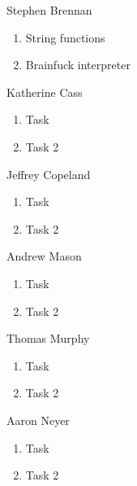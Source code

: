 \documentclass[journal,10pt]{IEEEtran}
\begin{document}
\begin{LaTeXitemize} \itemsep0pt \parskip0pt
  \item Stephen Brennan
  \begin{enumerate}
    \item String functions
    \item Brainfuck interpreter
  \end{enumerate}
  
  \item Katherine Cass
  \begin{enumerate}
    \item Task
    \item Task 2
  \end{enumerate}
  
  \item Jeffrey Copeland
  \begin{enumerate}
    \item Task
    \item Task 2
  \end{enumerate}

  \item Andrew Mason
  \begin{enumerate}
    \item Task
    \item Task 2
  \end{enumerate}

  \item Thomas Murphy
  \begin{enumerate}
    \item Task
    \item Task 2
  \end{enumerate}

  \item Aaron Neyer
  \begin{enumerate}
    \item Task
    \item Task 2
  \end{enumerate}

\end{LaTeXitemize}

%
%
\end{document}
